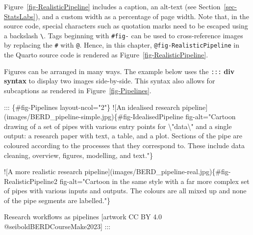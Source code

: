 \documentclass[
  letterpaper,
  DIV=11,
  numbers=noendperiod]{scrreprt}
\newenvironment{Shaded}{\begin{snugshade}}{\end{snugshade}}
\newcommand{\AlertTok}[1]{\textcolor[rgb]{0.68,0.00,0.00}{#1}}
\newcommand{\CommentTok}[1]{\textcolor[rgb]{0.37,0.37,0.37}{#1}}
\newcommand{\NormalTok}[1]{\textcolor[rgb]{0.00,0.23,0.31}{#1}}
\newcommand{\OtherTok}[1]{\textcolor[rgb]{0.00,0.23,0.31}{#1}}
\newcounter{none} %
\begin{document}
Figure~\ref{fig-RealisticPipeline} includes a caption, an alt-text (see
Section~\ref{sec-StatsLabs}), and a custom width as a percentage of page
width. Note that, in the source code, special characters such as
quotation marks need to be escaped using a backslash
\texttt{\textbackslash{}}. Tags beginning with \texttt{\#fig-} can be
used to cross-reference images by replacing the \texttt{\#} with
\texttt{@}. Hence, in this chapter, \texttt{@fig-RealisticPipeline} in
the Quarto source code is rendered as
Figure~\ref{fig-RealisticPipeline}.

Figures can be arranged in many ways. The example below uses the
\texttt{:::} \textbf{div syntax} to display two images side-by-side.
This syntax also allows for subcaptions as rendered in
Figure~\ref{fig-Pipelines}.

\begin{Shaded}
\begin{Highlighting}[]
\NormalTok{::: \{\#fig{-}Pipelines layout{-}ncol="2"\}}
\AlertTok{![An idealised research pipeline](images/BERD\_pipeline{-}simple.jpg)}\NormalTok{\{\#fig{-}IdealisedPipeline fig{-}alt="Cartoon drawing of a set of pipes with various entry points for \textbackslash{}"data\textbackslash{}" and a single output: a research paper with text, a table, and a plot. Sections of the pipe are coloured according to the processes that they correspond to. These include data cleaning, overview, figures, modelling, and text."\}}

\AlertTok{![A more realistic research pipeline](images/BERD\_pipeline{-}real.jpg)}\NormalTok{\{\#fig{-}RealisticPipeline2 fig{-}alt="Cartoon in the same style with a far more complex set of pipes with various inputs and outputs. The colours are all mixed up and none of the pipe segments are labelled."\}}

\NormalTok{Research workflows as pipelines }\CommentTok{[}\OtherTok{artwork CC BY 4.0 @seiboldBERDCourseMake2023}\CommentTok{]}
\NormalTok{:::}
\end{Highlighting}
\end{Shaded}
\end{document}
